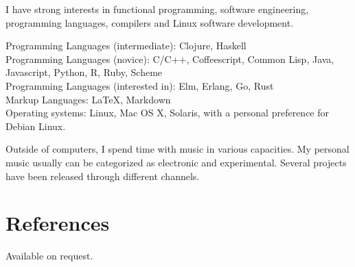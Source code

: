 \documentclass[margintitle,line]{res}
\begin{document}
\begin{resume}
I have strong interests in functional programming, software engineering, programming languages, compilers and Linux software development.

Programming Languages (intermediate): Clojure, Haskell \\
Programming Languages (novice): C/C++, Coffeescript, Common Lisp, Java, Javascript, Python, R, Ruby, Scheme \\
Programming Languages (interested in): Elm, Erlang, Go, Rust \\
Markup Languages: LaTeX, Markdown \\
Operating systems: Linux, Mac OS X, Solaris, with a personal preference for Debian Linux.

Outside of computers, I spend time with music in various capacities. My personal music usually can be categorized as electronic and experimental. Several projects have been released through different channels.

\section{References}

Available on request.

\end{resume}
\end{document}
